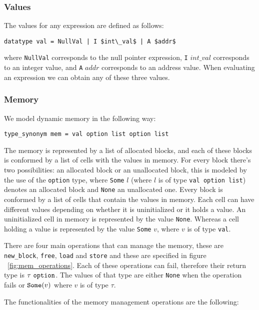 \subsubsection{Values} The values for any expression are defined as follows:

\begin{lstlisting}[frame=single, mathescape=true]
datatype val = NullVal | I $int\_val$ | A $addr$
\end{lstlisting}

where \verb|NullVal| corresponds to the null pointer expression, \verb|I| $int\_val$ corresponds to an integer value, and \verb|A| $addr$ corresponds to an address value.
When evaluating an expression we can obtain any of these three values.

\subsubsection{Memory}

We model dynamic memory in the following way:

\begin{lstlisting}[frame=single, mathescape=true]
type_synonym mem = val option list option list
\end{lstlisting}

The memory is represented by a list of allocated blocks, and each of these blocks is conformed by a list of cells with the values in memory.
For every block there's two possibilities: an allocated block or an unallocated block, this is modeled by the use of the \verb|option| type, where \verb|Some| $l$ (where $l$ is of type \verb|val option list|) denotes an allocated block and \verb|None| an unallocated one.
Every block is conformed by a list of cells that contain the values in memory.
Each cell can have different values depending on whether it is uninitialized or it holds a value.
An uninitialized cell in memory is represented by the value \verb|None|.
Whereas a cell holding a value is represented by the value \verb|Some| $v$, where $v$ is of type \verb|val|.

There are four main operations that can manage the memory, these are \verb|new_block|, \verb|free|, \verb|load| and \verb|store| and these are specified in figure ~\ref{fig:mem_operations}.
Each of these operations can fail, therefore their return type is $\tau\ \verb|option|$.
The values of that type are either \verb|None| when the operation fails or $\verb|Some|(v)$ where $v$ is of type $\tau$.

The functionalities of the memory management operations are the following:

